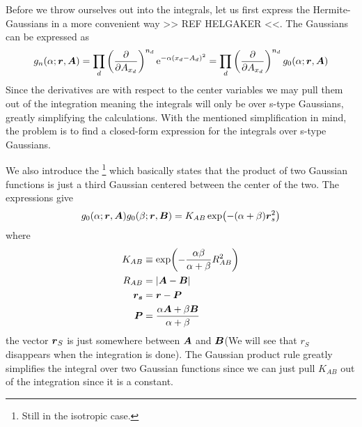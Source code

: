     Before we throw ourselves out into the integrals, let us first express the
    Hermite-Gaussians in a more convenient way >> REF HELGAKER <<. The
    Gaussians can be expressed as
        \begin{equation}
            g_n(\alpha;\boldsymbol{{r}},\boldsymbol{{A}}) = \prod_d  \left(\frac{\mathrm{\partial}}{\mathrm{\partial} A_{x_d}}\right)^{n_d}
            \mathrm{e}^{-\alpha (x_d-A_d)^2} = \prod_d \left(\frac{\mathrm{\partial}}{\mathrm{\partial} A_{x_d}}\right)^{n_d}
            g_0(\alpha;\boldsymbol{{r}},\boldsymbol{{A}})
            \label{eq:centerDerGauss}
        \end{equation}
    Since the derivatives are with respect to the center variables we may pull
    them out of the integration meaning the integrals will only be over s-type
    Gaussians, greatly simplifying the calculations. With the mentioned
    simplification in mind, the problem is to find a closed-form expression for
    the integrals over s-type Gaussians.

    We also introduce the \footnote{Still in the
    isotropic case.} which basically states that the product of two Gaussian
    functions is just a third Gaussian centered between the center of the two.
    The expressions give
        \begin{equation}
            g_0(\alpha;\boldsymbol{{r}},\boldsymbol{{A}})g_0(\beta;\boldsymbol{{r}},\boldsymbol{{B}}) =
            K_{AB}\exp(-(\alpha+\beta)\boldsymbol{{r}}^2_s)
            \label{eq:gaussianProductRule}
        \end{equation}
    where
        \begin{equation}
            \begin{aligned}
                K_{AB} &\equiv \exp(-\frac{\alpha\beta}{\alpha+\beta}R^2_{AB})
                \\
                R_{AB} &= \abs{\boldsymbol{{A}} - \boldsymbol{{B}}} \\
                \boldsymbol{{r_s}} &= \boldsymbol{{r}} - \boldsymbol{{P}} \\
                \boldsymbol{{P}} &= \frac{\alpha\boldsymbol{{A}} +
                \beta\boldsymbol{{B}}}{\alpha + \beta}
            \end{aligned}
        \end{equation}
    the vector $\boldsymbol{{r}}_S$ is just somewhere between $\boldsymbol{{A}}$ and
    $\boldsymbol{{B}}$(We will see that $r_S$ disappears when the integration is done).
    The Gaussian product rule greatly simplifies the integral over two Gaussian
    functions since we can just pull $K_{AB}$ out of the integration since it
    is a constant.

